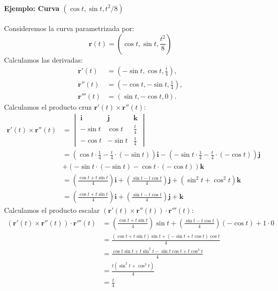 \documentclass[11pt]{book}
\theoremstyle{definicion}
\theoremstyle{teorema}
\theoremstyle{ejemplo}
\begin{document}
\paragraph{Ejemplo: Curva \((\cos t, \sin t, t^2/8)\)}

\noindent
Consideremos la curva parametrizada por:
\begin{equation*}
\mathbf{r}(t) = (\cos t, \sin t, \frac{t^2}{8})
\end{equation*}
Calculamos las derivadas:
\begin{align*}
\mathbf{r}'(t) &= (-\sin t, \cos t, \frac{t}{4}), \\
\mathbf{r}''(t) &= (-\cos t, -\sin t, \frac{1}{4}), \\
\mathbf{r}'''(t) &= (\sin t, -\cos t, 0).
\end{align*}
Calculamos el producto cruz \(\mathbf{r}'(t) \times \mathbf{r}''(t)\):
\begin{align*}
\mathbf{r}'(t) \times \mathbf{r}''(t) &= \begin{vmatrix}
\mathbf{i} & \mathbf{j} & \mathbf{k} \\
-\sin t & \cos t & \frac{t}{4} \\
-\cos t & -\sin t & \frac{1}{4}
\end{vmatrix} \\
&= \left( \cos t \cdot \frac{1}{4} - \frac{t}{4} \cdot (-\sin t) \right) \mathbf{i} - \left( -\sin t \cdot \frac{1}{4} - \frac{t}{4} \cdot (-\cos t) \right) \mathbf{j} \\\ & + \left( -\sin t \cdot (-\sin t) - \cos t \cdot (-\cos t) \right) \mathbf{k} \\
&= \left( \frac{\cos t + t \sin t}{4} \right) \mathbf{i} + \left( \frac{\sin t - t \cos t}{4} \right) \mathbf{j} + (\sin^2 t + \cos^2 t) \mathbf{k} \\
&= \left( \frac{\cos t + t \sin t}{4} \right) \mathbf{i} + \left( \frac{\sin t - t \cos t}{4} \right) \mathbf{j} + \mathbf{k}
\end{align*}
Calculamos el producto escalar \((\mathbf{r}'(t) \times \mathbf{r}''(t)) \cdot \mathbf{r}'''(t)\):
\begin{align*}
(\mathbf{r}'(t) \times \mathbf{r}''(t)) \cdot \mathbf{r}'''(t) &= \left( \frac{\cos t + t \sin t}{4} \right) \sin t + \left( \frac{\sin t - t \cos t}{4} \right) (-\cos t) + 1 \cdot 0 \\
&= \frac{(\cos t + t \sin t) \sin t + (-\sin t + t \cos t) \cos t}{4} \\
&= \frac{\cos t \sin t + t \sin^2 t - \sin t \cos t + t \cos^2 t}{4} \\
&= \frac{t (\sin^2 t + \cos^2 t)}{4} \\
&= \frac{t}{4}
\end{align*}
\end{document}
